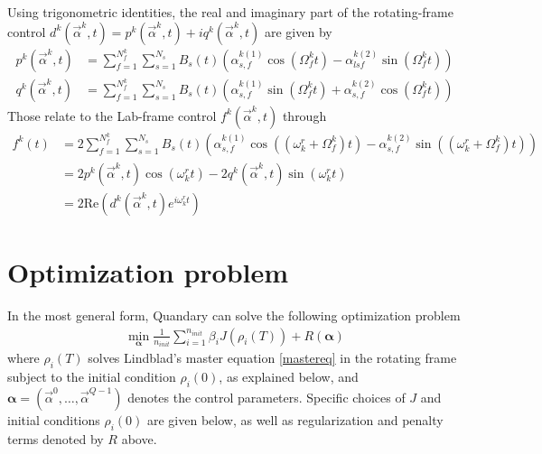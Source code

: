 \documentclass[11pt]{article}
\begin{document}
Using trigonometric identities, the real and imaginary part of the rotating-frame control $d^k(\vec{\alpha}^k,t) = p^k(\vec{\alpha}^k,t) + iq^k(\vec{\alpha}^k,t)$ are given by
\begin{align}
  p^k(\vec{\alpha}^k,t) &= \sum_{f=1}^{N_f^k} \sum_{s=1}^{N_s} B_s(t)
  \left(\alpha^{k
  (1)}_{s,f} \cos(\Omega_f^k t) - \alpha^{k (2)}_{lsf} \sin(\Omega_f^k t)
  \right) \\
  q^k(\vec{\alpha}^k,t) &= \sum_{f=1}^{N_f^k} \sum_{s=1}^{N_s} B_s(t)\left( \alpha^{k
  (1)}_{s,f} \sin(\Omega_f^k t) + \alpha^{k (2)}_{s,f} \cos(\Omega_f^k t)
  \right)
\end{align}
Those relate to the Lab-frame control $f^k(\vec{\alpha}^k,t)$ through
\begin{align}
  f^k(t) &=  2\sum_{f=1}^{N_f^k} \sum_{s=1}^{N_s} B_s(t) \left(\alpha_{s,f}^{k(1)} \cos((\omega_k^{r} + \Omega_f^k) t) - \alpha_{s,f}^{k(2)}\sin((\omega_k^{r} + \Omega_f^k) t) \right) \\
         &= 2 p^k(\vec{\alpha}^k, t) \cos(\omega_k^{r} t) - 2 q^k(\vec{\alpha}^k,
         t)\sin(\omega_k^{r} t) \\
         &= 2\mbox{Re}\left( d^k(\vec{\alpha}^k,t)e^{i\omega_k^r t} \right)
\end{align}


\section{Optimization problem}
In the most general form, Quandary can solve the following optimization problem
\begin{align}
  \min_{\boldsymbol{\alpha}} \frac{1}{n_{init}} \sum_{i=1}^{n_{init}} \beta_i J(\rho_i(T))  + R(\boldsymbol{\alpha})
\end{align}
where $\rho_i(T)$ solves Lindblad's master equation \eqref{mastereq} in the rotating frame subject to the initial condition $\rho_i(0)$, as explained below, and $\boldsymbol{\alpha} = \left(\vec{\alpha}^0, \dots, \vec{\alpha}^{Q-1}\right)$ denotes the control parameters. Specific choices of $J$ and initial conditions $\rho_i(0)$ are given below, as well as regularization and penalty terms denoted by $R$ above. 
\end{document}
